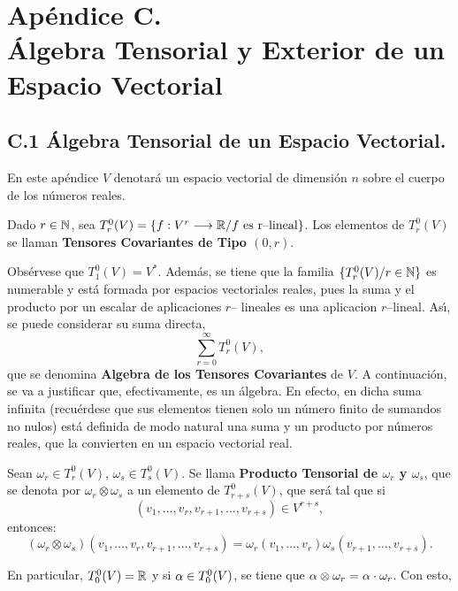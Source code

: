 \documentclass[cursovd_portada.tex]{subfiles}
\begin{document}
\chapter*{Ap\'endice C.\\\'Algebra Tensorial y Exterior de un Espacio Vectorial}
\section*{C.1 \'{A}lgebra Tensorial de un Espacio Vectorial.}
 \hs En este ap\'{e}ndice
$V$ denotar\'{a} un espacio vectorial de dimensi\'{o}n $n$ sobre el cuerpo de los n\'{u}meros reales.
\begin{defiap}
Dado $r\in\mathbb{N}$, sea $T^0_r(V)=\{f:V^r\longrightarrow\mathbb{R} / f \mbox{ es r--lineal}\}$. Los elementos de $T^0_r(V)$ se llaman {\bf
Tensores Covariantes de Tipo $(0,r)$}.
\end{defiap}
\par\bigskip
Obs\'{e}rvese que $T^0_1(V)=V^*$. Adem\'{a}s, se tiene que la familia $\{T^0_r(V)/r\in\mathbb{N}\}$ es numerable y est\'{a} formada
por espacios vectoriales reales, pues la suma y el producto por un escalar de aplicaciones $r$-- lineales es una
aplicacion $r$--lineal. As\'{\i}, se puede considerar su suma directa,
$$\sum_{r=0}^\infty T^0_r(V),$$
que se denomina {\bf Algebra de los Tensores Covariantes} de $V$. A con\-ti\-nua\-ci\'{o}n, se va a justificar que,
efectivamente, es un \'{a}lgebra. En efecto, en dicha suma infinita (recu\'{e}rdese que sus elementos tienen solo un
n\'{u}mero finito de sumandos no nulos) est\'{a} definida de modo natural una suma y un producto por n\'{u}meros reales, que
la convierten en un espacio vectorial real.
\begin{defiap}
Sean $\omega_r\in T^0_r(V)$, $\omega_s\in T^0_s(V)$. Se llama {\bf Producto Tensorial de $\omega_r$ y $\omega_s$},
que se denota por $\omega_r\otimes \omega_s$ a un elemento de $T^0_{r+s}(V)$, que ser\'{a} tal que si
$$(v_1,\dots ,v_r,v_{r+1},\dots ,v_{r+s})\in V^{r+s},$$
entonces:
$$(\omega_r\otimes\omega_s)(v_1,\dots ,v_r,v_{r+1},\dots ,v_{r+s})=
\omega_r(v_1,\dots ,v_r)\omega_s(v_{r+1},\dots,v_{r+s}).$$
\end{defiap}
\par\bigskip
En particular, $T_0^0(V)=\mathbb{R}$ y si $\alpha\in T^0_0(V)$, se tiene que $\alpha\otimes \omega_r=\alpha\cdot\omega_r$. Con esto,
\end{document}
